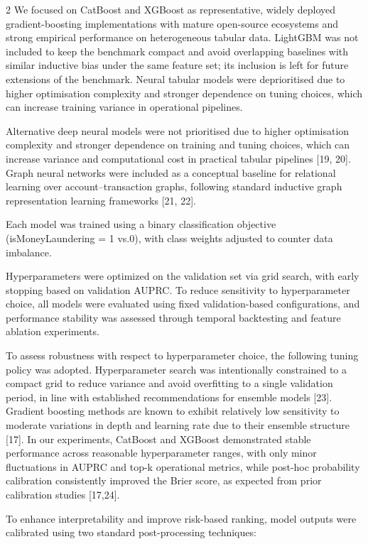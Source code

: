 \begin{multicols}{2}
We focused on CatBoost and XGBoost as representative, widely deployed
gradient-boosting implementations with mature open-source ecosystems and
strong empirical performance on heterogeneous tabular data. LightGBM was
not included to keep the benchmark compact and avoid overlapping
baselines with similar inductive bias under the same feature set; its
inclusion is left for future extensions of the benchmark. Neural tabular
models were deprioritised due to higher optimisation complexity and
stronger dependence on tuning choices, which can increase training
variance in operational pipelines.

Alternative deep neural models were not prioritised due to higher
optimisation complexity and stronger dependence on training and tuning
choices, which can increase variance and computational cost in practical
tabular pipelines {[}19, 20{]}. Graph neural networks were included as a
conceptual baseline for relational learning over account--transaction
graphs, following standard inductive graph representation learning
frameworks {[}21, 22{]}.

Each model was trained using a binary classification objective
(isMoneyLaundering = 1 vs.0), with class weights adjusted to counter
data imbalance.~

Hyperparameters were optimized on the validation set via grid search,
with early stopping based on validation AUPRC. To reduce sensitivity to
hyperparameter choice, all models were evaluated using fixed
validation-based configurations, and performance stability was assessed
through temporal backtesting and feature ablation experiments.~

To assess robustness with respect to hyperparameter choice, the
following tuning policy was adopted. Hyperparameter search was
intentionally constrained to a compact grid to reduce variance and avoid
overfitting to a single validation period, in line with established
recommendations for ensemble models {[}23{]}. Gradient boosting methods
are known to exhibit relatively low sensitivity to moderate variations
in depth and learning rate due to their ensemble structure {[}17{]}. In
our experiments, CatBoost and XGBoost demonstrated stable performance
across reasonable hyperparameter ranges, with only minor fluctuations in
AUPRC and top-k operational metrics, while post-hoc probability
calibration consistently improved the Brier score, as expected from
prior calibration studies {[}17,24{]}.

To enhance interpretability and improve risk-based ranking, model
outputs were calibrated using two standard post-processing techniques:


\end{multicols}
